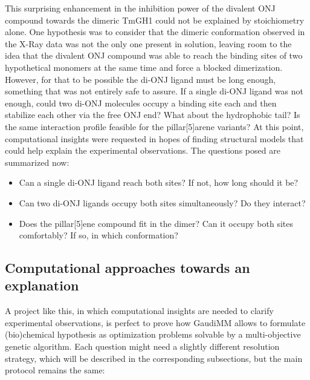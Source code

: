 This surprising enhancement in the inhibition power of the divalent ONJ compound towards the dimeric TmGH1 could not be explained by stoichiometry alone. One hypothesis was to consider that the dimeric conformation observed in the X-Ray data was not the only one present in solution, leaving room to the idea that the divalent ONJ compound was able to reach the binding sites of two hypothetical monomers at the same time and force a blocked dimerization. However, for that to be possible the di-ONJ ligand must be long enough, something that was not entirely safe to assure. If a single di-ONJ ligand was not enough, could two di-ONJ molecules occupy a binding site each and then stabilize each other via the free ONJ end? What about the hydrophobic tail? Is the same interaction profile feasible for the pillar[5]arene variants? At this point, computational insights were requested in hopes of finding structural models that could help explain the experimental observations. The questions posed are summarized now:

\begin{itemize}
	\item Can a single di-ONJ ligand reach both sites? If not, how long should it be?
	\item Can two di-ONJ ligands occupy both sites simultaneously? Do they interact?
	\item Does the pillar[5]ene compound fit in the dimer? Can it occupy both sites comfortably? If so, in which conformation?
\end{itemize}

\subsection{Computational approaches towards an explanation}
A project like this, in which computational insights are needed to clarify experimental observations, is perfect to prove how GaudiMM allows to formulate (bio)chemical hypothesis as optimization problems solvable by a multi-objective genetic algorithm. Each question might need a slightly different resolution strategy, which will be described in the corresponding subsections, but the main protocol remains the same:


